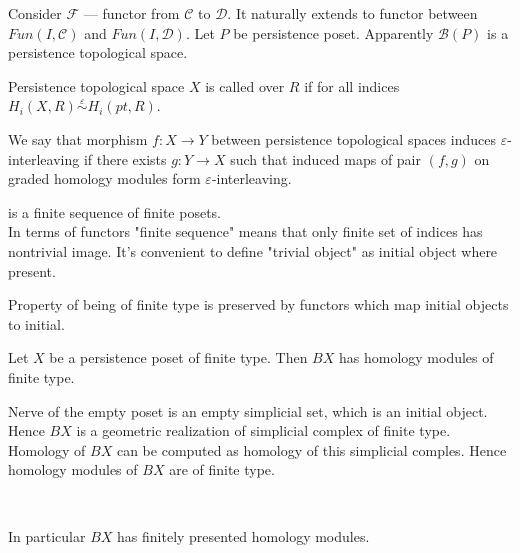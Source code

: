 Consider $\mathcal{F}$ --- functor from $\mathcal{C}$ to $\mathcal{D}$. It naturally extends to functor between $Fun(I,\mathcal{C})$ and $Fun(I,\mathcal{D})$. Let $P$ be persistence poset. Apparently $\mathcal{B}(P)$ is a persistence topological space.\\

\begin{definition}
  Persistence topological space $X$ is called  over $R$ if for all indices\\ $H_i(X,R) \stackrel{\varepsilon}{\sim} H_i(pt,R)$.
\end{definition}

\begin{definition}
  We say that morphism $f : X \to Y$ between persistence topological spaces induces $\varepsilon$-interleaving if there exists $g : Y \to X$ such that induced maps of pair $(f,g)$ on graded homology modules form $\varepsilon$-interleaving.
\end{definition}

\begin{definition}
   is a finite sequence of finite posets.\\

  In terms of functors "finite sequence" means that only finite set of indices has nontrivial image. It's convenient to define "trivial object" as initial object where present.
\end{definition}

Property of being of finite type is preserved by functors which map initial objects to initial.\\

\begin{proposition}
  Let $X$ be a persistence poset of finite type. Then $BX$ has homology modules of finite type.
\end{proposition}

\begin{pf}
  Nerve of the empty poset is an empty simplicial set, which is an initial object. Hence $BX$ is a geometric realization of simplicial complex of finite type. Homology of $BX$ can be computed as homology of this simplicial comples. Hence homology modules of $BX$ are of finite type.
\end{pf}\\

\begin{corollary}
  In particular $BX$ has finitely presented homology modules.
\end{corollary}

